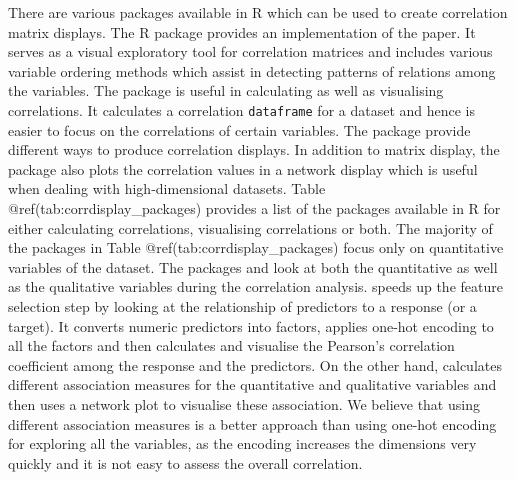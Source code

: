There are various packages available in R which can be used to create
correlation matrix displays. The R package 
\citep{corrplot2021} provides an implementation of the
\citet{friendly2002corrgrams} paper. It serves as a visual exploratory
tool for correlation matrices and includes various variable ordering
methods which assist in detecting patterns of relations among the
variables. The package  \citep{corrr2020} is useful in
calculating as well as visualising correlations. It calculates a
correlation \texttt{dataframe} for a dataset and hence is easier to
focus on the correlations of certain variables. The package provide
different ways to produce correlation displays. In addition to matrix
display, the package also plots the correlation values in a network
display which is useful when dealing with high-dimensional datasets.
Table @ref(tab:corrdisplay\_packages) provides a list of the packages
available in R for either calculating correlations, visualising
correlations or both. The majority of the packages in Table
@ref(tab:corrdisplay\_packages) focus only on quantitative variables of
the dataset. The packages 
\citep{correlationfunnel} and  \citep{linkspotter}
look at both the quantitative as well as the qualitative variables
during the correlation analysis.  speeds up
the feature selection step by looking at the relationship of predictors
to a response (or a target). It converts numeric predictors into
factors, applies one-hot encoding to all the factors and then calculates
and visualise the Pearson's correlation coefficient among the response
and the predictors. On the other hand,  calculates
different association measures for the quantitative and qualitative
variables and then uses a network plot to visualise these association.
We believe that using different association measures is a better
approach than using one-hot encoding for exploring all the variables, as
the encoding increases the dimensions very quickly and it is not easy to
assess the overall correlation.

